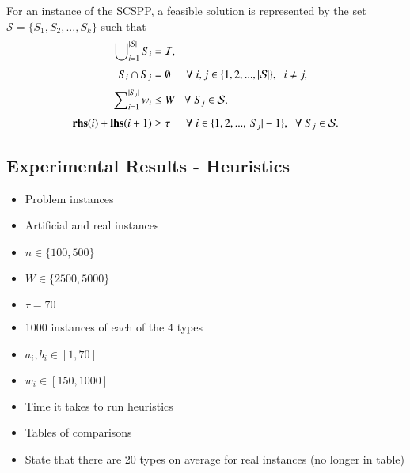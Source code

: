 \documentclass{elsarticle}
\begin{document}
For an instance of the SCSPP, a feasible solution is represented by the set $\mathcal{S} = \{S_1, S_2, ..., S_k\}$ such that
\begin{subequations}
	\begin{align}
	\bigcup\nolimits_{i=1}^{|\mathcal{S}|} S_i &= \mathcal{I}, \label{eqn:packall}\\[3pt]
	S_i \cap S_j &= \emptyset \hspace{5mm} \forall \hspace{1mm} i, j \in \{1, 2, ..., |\mathcal{S}|\}, \hspace{2mm} i \neq j, \label{eqn:nooverlap} \\[3pt]
	\sum\nolimits_{i=1}^{|S_j|}w_i & \leq W \hspace{3mm} \forall \hspace{1mm} S_j \in \mathcal{S}, \label{eqn:capacity} \\[3pt]
	\textup{\textbf{rhs}}(i) + \textup{\textbf{lhs}}(i+1) &\geq \tau \hspace {5mm} \forall \hspace{1mm} i \in \{1, 2, ..., |S_j|-1\}, \hspace{2mm} \forall \hspace{1mm} S_j \in \mathcal{S}. \label{eqn:vscstrip}
	\end{align}
\end{subequations}


\subsection{Experimental Results - Heuristics}
\begin{itemize}
	\item Problem instances
	\item Artificial and real instances
	\item $n \in \{100,500\}$
	\item $W \in \{2500,5000\}$
	\item $\tau = 70$
	\item 1000 instances of each of the 4 types
	\item $a_i, b_i \in [1,70]$
	\item $w_i \in [150,1000]$
	\item Time it takes to run heuristics
	\item Tables of comparisons
	\item State that there are 20 types on average for real instances (no longer in table)
\end{itemize}
\end{document}
